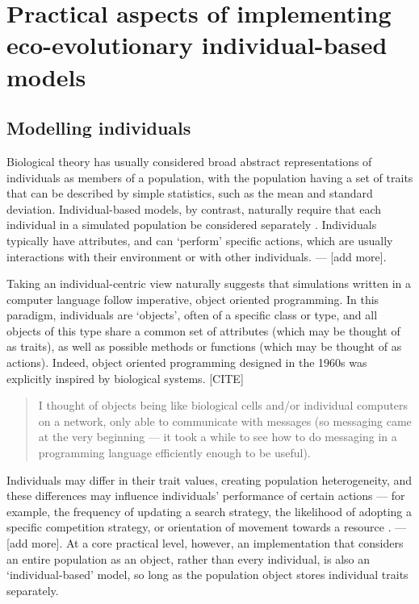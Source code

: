 \section*{Practical aspects of implementing eco-evolutionary individual-based models}

\subsection*{Modelling individuals}

Biological theory has usually considered broad abstract representations of individuals as members of a population, with the population having a set of traits that can be described by simple statistics, such as the mean and standard deviation.
Individual-based models, by contrast, naturally require that each individual in a simulated population be considered separately \citep{macnamara-houston197x}.
Individuals typically have attributes, and can `perform' specific actions, which are usually interactions with their environment or with other individuals. --- [add more].

Taking an individual-centric view naturally suggests that simulations written in a computer language follow imperative, object oriented programming.
In this paradigm, individuals are `objects', often of a specific class or type, and all objects of this type share a common set of attributes (which may be thought of as traits), as well as possible methods or functions (which may be thought of as actions).
Indeed, object oriented programming designed in the 1960s was explicitly inspired by biological systems. [CITE]

\begin{quotation}
    I thought of objects being like biological cells and/or individual computers on a network, only able to communicate with messages (so messaging came at the very beginning --- it took a while to see how to do messaging in a programming language efficiently enough to be useful).
\end{quotation}

Individuals may differ in their trait values, creating population heterogeneity, and these differences may influence individuals' performance of certain actions --- for example, the frequency of updating a search strategy, the likelihood of adopting a specific competition strategy, or orientation of movement towards a resource \citep{swain2021}. --- [add more].
At a core practical level, however, an implementation that considers an entire population as an object, rather than every individual, is also an `individual-based' model, so long as the population object stores individual traits separately.


